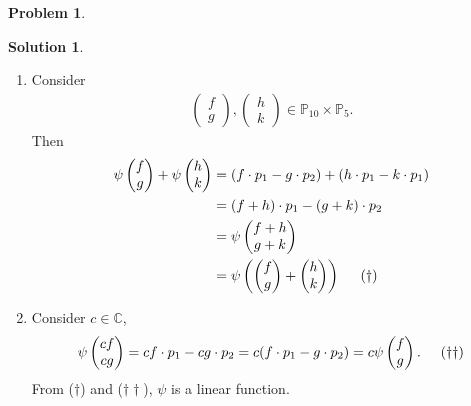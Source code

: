 \documentclass{article}
\theoremstyle{definition}
\newtheorem*{prob*}{Problem}
\newtheorem*{sln*}{Solution}
\begin{document}
\begin{prob*}
\begin{sln*}
\begin{enumerate}
	\begin{enumerate}
		\item Consider 
		\begin{align*}
		\begin{pmatrix}
		f\\g
		\end{pmatrix},
		\begin{pmatrix}
		h\\k
		\end{pmatrix} \in \mathbb{P}_{10}\times \mathbb{P}_5.
		\end{align*}
		Then
		\begin{align*}
		\psi\begin{pmatrix}
		f\\g
		\end{pmatrix}
		+
		\psi\begin{pmatrix}
		h\\k
		\end{pmatrix}
		&=
		(f\cdot p_1 - g\cdot p_2) + (h\cdot p_1 - k\cdot p_1)\\ 
		&= (f+h)\cdot p_1 - (g+k)\cdot p_2 \\
		&= \psi\begin{pmatrix}
		f+h\\g+k
		\end{pmatrix}\\
		&= \psi\left(\begin{pmatrix}
		f\\g
		\end{pmatrix}+ \begin{pmatrix}
		h\\k
		\end{pmatrix}\right)\hspace{0.5cm}(\dagger)
		\end{align*}
		\item Consider $c\in \mathbb{C} $, 
		\begin{align*}
		\psi \begin{pmatrix}
		cf \\ cg
		\end{pmatrix} = cf\cdot p_1 - cg\cdot p_2 = c(f \cdot p_1 - g \cdot p_2) = c\psi\begin{pmatrix}
		f\\g
		\end{pmatrix}.\hspace{0.5cm}(\dagger\dagger)
		\end{align*}
		From ($\dagger$) and ($\dagger\dagger$), $\psi$ is a linear function.
		

\end{enumerate}
\end{enumerate}
\end{sln*}
\end{prob*}
\end{document}
